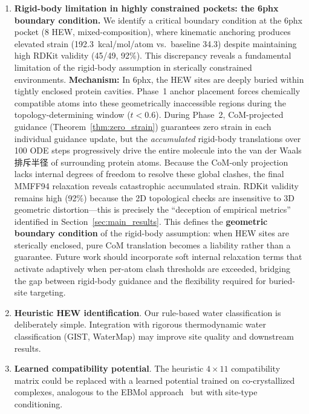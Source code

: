 \documentclass{article}
\begin{document}
\begin{enumerate}[leftmargin=*]
  \item \textbf{Rigid-body limitation in highly constrained pockets:
    the 6phx boundary condition.}
    We identify a critical boundary condition at the 6phx pocket (8 HEW,
    mixed-composition), where kinematic anchoring produces elevated strain
    (192.3~kcal/mol/atom vs.\ baseline 34.3) despite maintaining high RDKit
    validity (45/49, 92\%).  This discrepancy reveals a fundamental
    limitation of the rigid-body assumption in sterically constrained
    environments.  \textbf{Mechanism:} In 6phx, the HEW sites are deeply
    buried within tightly enclosed protein cavities.  Phase~1 anchor
    placement forces chemically compatible atoms into these geometrically
    inaccessible regions during the topology-determining window ($t < 0.6$).
    During Phase~2, CoM-projected guidance (Theorem~\ref{thm:zero_strain})
    guarantees zero strain in each individual guidance update, but the
    \emph{accumulated} rigid-body translations over 100 ODE steps
    progressively drive the entire molecule into the van der Waals排斥半径
    of surrounding protein atoms.  Because the CoM-only projection lacks
    internal degrees of freedom to resolve these global clashes, the
    final MMFF94 relaxation reveals catastrophic accumulated strain.  RDKit
    validity remains high (92\%) because the 2D topological checks are
    insensitive to 3D geometric distortion---this is precisely the
    ``deception of empirical metrics'' identified in
    Section~\ref{sec:main_results}.  This defines the \textbf{geometric
    boundary condition} of the rigid-body assumption: when HEW sites are
    sterically enclosed, pure CoM translation becomes a liability rather
    than a guarantee.  Future work should incorporate soft internal
    relaxation terms that activate adaptively when per-atom clash
    thresholds are exceeded, bridging the gap between rigid-body guidance
    and the flexibility required for buried-site targeting.

  \item \textbf{Heuristic HEW identification}.  Our rule-based water
    classification is deliberately simple.  Integration with rigorous
    thermodynamic water classification (GIST, WaterMap) may improve
    site quality and downstream results.

  \item \textbf{Learned compatibility potential}.  The heuristic
    $4 \times 11$ compatibility matrix could be replaced with a learned
    potential trained on co-crystallized complexes, analogous to the
    EBMol approach~\cite{griesbacher2026ebmol} but with site-type
    conditioning.


\end{enumerate}
\end{document}
